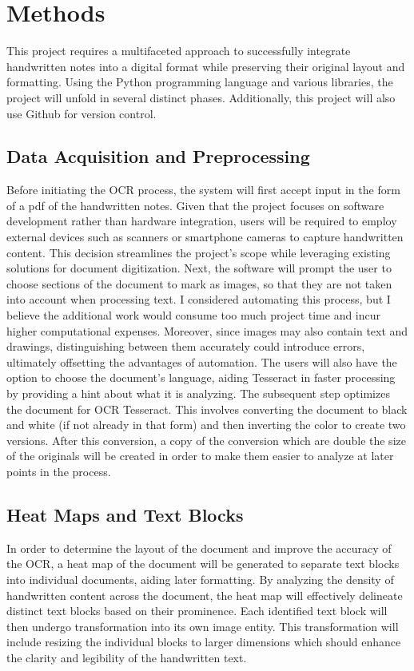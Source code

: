\documentclass[10pt,twocolumn]{article}
\begin{document}
\section{Methods}
This project requires a multifaceted approach to successfully integrate handwritten notes into a digital format while preserving their original layout and formatting. Using the Python programming language and various libraries, the project will unfold in several distinct phases. Additionally, this project will also use Github for version control.

\subsection{Data Acquisition and Preprocessing}
Before initiating the OCR process, the system will first accept input in the form of a pdf of the handwritten notes. Given that the project focuses on software development rather than hardware integration, users will be required to employ external devices such as scanners or smartphone cameras to capture handwritten content. This decision streamlines the project's scope while leveraging existing solutions for document digitization. Next, the software will prompt the user to choose sections of the document to mark as images, so that they are not taken into account when processing text. I considered automating this process, but I believe the additional work would consume too much project time and incur higher computational expenses. Moreover, since images may also contain text and drawings, distinguishing between them accurately could introduce errors, ultimately offsetting the advantages of automation. The users will also have the option to choose the document's language, aiding Tesseract in faster processing by providing a hint about what it is analyzing. The subsequent step optimizes the document for OCR Tesseract. This involves converting the document to black and white (if not already in that form) and then inverting the color to create two versions. After this conversion, a copy of the conversion which are double the size of the originals will be created in order to make them easier to analyze at later points in the process. 

\subsection{Heat Maps and Text Blocks}
 In order to determine the layout of the document and improve the accuracy of the OCR, a heat map of the document will be generated to separate text blocks into individual documents, aiding later formatting. By analyzing the density of handwritten content across the document, the heat map will effectively delineate distinct text blocks based on their prominence. Each identified text block will then undergo transformation into its own image entity. This transformation will include resizing the individual blocks to larger dimensions which should enhance the clarity and legibility of the handwritten text.
\end{document}
